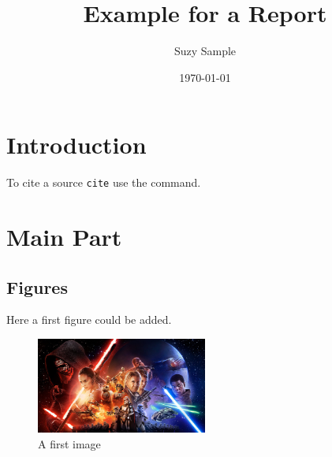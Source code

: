 \documentclass[12pt,a4paper]{article} %
\title{Example for a Report}
\date{\today}
\author{Suzy Sample}
\begin{document}
\maketitle %
% 










\newpage 

\tableofcontents %














\newpage


\section{Introduction}
\blindtext

To cite  a source \texttt{cite} use the \cite{buch1} command. 


\newpage



\section{Main Part}
\subsection{Figures}

Here a first figure could be added.

\begin{figure}[h] %
\centering %
\includegraphics[width=0.5\textwidth]{star_wars.jpeg} %
\caption{A first image \cite{sw16}}
\end{figure}
\end{document}
